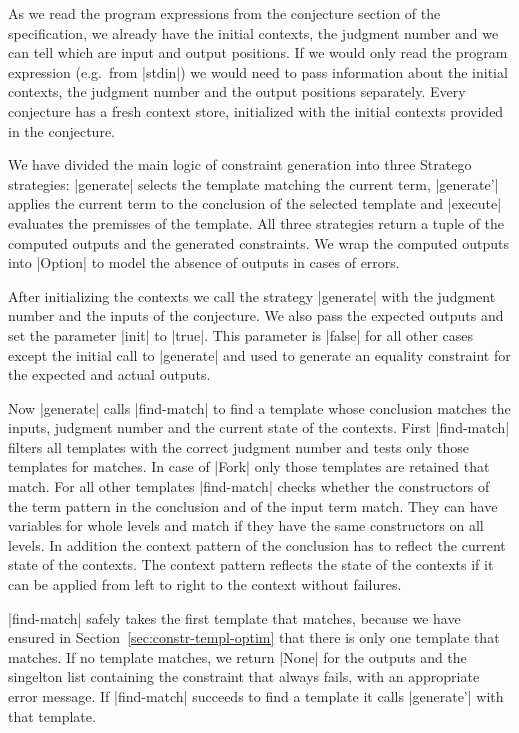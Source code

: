 As we read the program expressions from the conjecture section of the
specification, we already have the initial contexts, the judgment
number and we can tell which are input and output positions. If we
would only read the program expression (e.g.\ from \code|stdin|) we
would need to pass information about the initial contexts, the
judgment number and the output positions separately. Every conjecture
has a fresh context store, initialized with the initial contexts
provided in the conjecture.

We have divided the main logic of constraint generation into three
Stratego strategies: \code|generate| selects the template matching the
current term, \code|generate'| applies the current term to the
conclusion of the selected template and \code|execute| evaluates the
premisses of the template. All three strategies return a tuple of the
computed outputs and the generated constraints. We wrap the computed
outputs into \code|Option| to model the absence of outputs in cases of
errors.

After initializing the contexts we call the strategy \code|generate|
with the judgment number and the inputs of the conjecture. We also
pass the expected outputs and set the parameter \code|init| to
\code|true|. This parameter is \code|false| for all other cases except
the initial call to \code|generate| and used to generate an equality
constraint for the expected and actual outputs.

Now \code|generate| calls \code|find-match| to find a template whose
conclusion matches the inputs, judgment number and the current state
of the contexts. First \code|find-match| filters all templates with
the correct judgment number and tests only those templates for
matches.  In case of
\code|Fork| only those templates are retained that match. For all
other templates \code|find-match| checks whether the constructors of
the term pattern in the conclusion and of the input term match. They
can have variables for whole levels and match if they have the same
constructors on all levels. In addition the context pattern of the
conclusion has to reflect the current state of the contexts. The
context pattern reflects the state of the contexts if it can be
applied from left to right to the context without failures.

\code|find-match| safely takes the first template that matches,
because we have ensured in Section~\ref{sec:constr-templ-optim} that
there is only one template that matches. If no template matches, we
return \code|None| for the outputs and the singelton list containing
the constraint that always fails, with an appropriate error
message. If \code|find-match| succeeds to find a template it calls
\code|generate'| with that template.

